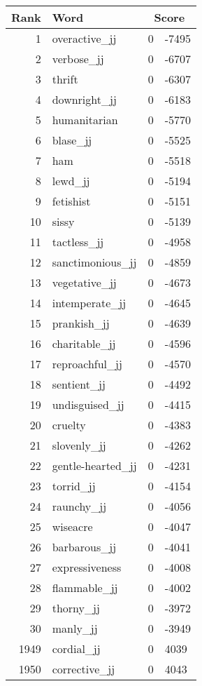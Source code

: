 \begin{longtable}[!htbp]{| rlr@{.}l |}
    \hline
    \textbf{Rank} & \textbf{Word} & \multicolumn{2}{c|}{\textbf{Score}} \\
    \hline
    \endhead
    1 & overactive\_jj & 0 & -7495 \\
    2 & verbose\_jj & 0 & -6707 \\
    3 & thrift & 0 & -6307 \\
    4 & downright\_jj & 0 & -6183 \\
    5 & humanitarian & 0 & -5770 \\
    6 & blase\_jj & 0 & -5525 \\
    7 & ham & 0 & -5518 \\
    8 & lewd\_jj & 0 & -5194 \\
    9 & fetishist & 0 & -5151 \\
    10 & sissy & 0 & -5139 \\
    11 & tactless\_jj & 0 & -4958 \\
    12 & sanctimonious\_jj & 0 & -4859 \\
    13 & vegetative\_jj & 0 & -4673 \\
    14 & intemperate\_jj & 0 & -4645 \\
    15 & prankish\_jj & 0 & -4639 \\
    16 & charitable\_jj & 0 & -4596 \\
    17 & reproachful\_jj & 0 & -4570 \\
    18 & sentient\_jj & 0 & -4492 \\
    19 & undisguised\_jj & 0 & -4415 \\
    20 & cruelty & 0 & -4383 \\
    21 & slovenly\_jj & 0 & -4262 \\
    22 & gentle-hearted\_jj & 0 & -4231 \\
    23 & torrid\_jj & 0 & -4154 \\
    24 & raunchy\_jj & 0 & -4056 \\
    25 & wiseacre & 0 & -4047 \\
    26 & barbarous\_jj & 0 & -4041 \\
    27 & expressiveness & 0 & -4008 \\
    28 & flammable\_jj & 0 & -4002 \\
    29 & thorny\_jj & 0 & -3972 \\
    30 & manly\_jj & 0 & -3949 \\
    1949 & cordial\_jj & 0 & 4039 \\
    1950 & corrective\_jj & 0 & 4043 \\

\end{longtable}
